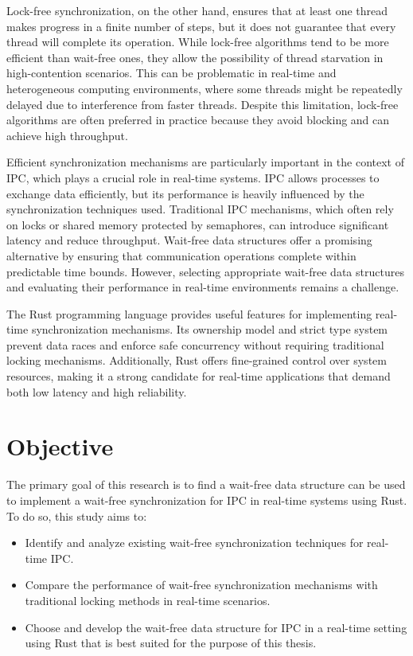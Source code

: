 Lock-free synchronization, on the other hand, ensures that at least one thread makes progress in a finite number of steps, but it does not guarantee that every thread will complete its operation. While lock-free algorithms tend to be more efficient than wait-free ones, they allow the possibility of thread starvation in high-contention scenarios. This can be problematic in real-time and heterogeneous computing environments, where some threads might be repeatedly delayed due to interference from faster threads. Despite this limitation, lock-free algorithms are often preferred in practice because they avoid blocking and can achieve high throughput. \cite{kogan2012methodology}

Efficient synchronization mechanisms are particularly important in the context of \ac{IPC}, which plays a crucial role in real-time systems. \ac{IPC} allows processes to exchange data efficiently, but its performance is heavily influenced by the synchronization techniques used. Traditional \ac{IPC} mechanisms, which often rely on locks or shared memory protected by semaphores, can introduce significant latency and reduce throughput. Wait-free data structures offer a promising alternative by ensuring that communication operations complete within predictable time bounds. However, selecting appropriate wait-free data structures and evaluating their performance in real-time environments remains a challenge. \cite{timnat2014practical, michael1996simple, huang2002improvingWaitFree, pellegrini2020relevancewaitfreecoordinationalgorithms}

The Rust programming language provides useful features for implementing real-time synchronization mechanisms. Its ownership model and strict type system prevent data races and enforce safe concurrency without requiring traditional locking mechanisms. Additionally, Rust offers fine-grained control over system resources, making it a strong candidate for real-time applications that demand both low latency and high reliability. \cite{xu2023rust, sharma2024rustembeddedsystemscurrent}

\section{Objective}

The primary goal of this research is to find a wait-free data structure can be used to implement a wait-free synchronization for \ac{IPC} in real-time systems using Rust. To do so, this study aims to:

\begin{itemize}
\item Identify and analyze existing wait-free synchronization techniques for real-time \ac{IPC}.
\item Compare the performance of wait-free synchronization mechanisms with traditional locking methods in real-time scenarios.
\item Choose and develop the wait-free data structure for \ac{IPC} in a real-time setting using Rust that is best suited for the purpose of this thesis.
\end{itemize}


